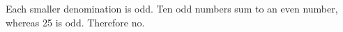 Each smaller denomination is odd. Ten odd numbers sum to an even number, whereas 25 is odd. Therefore $\boxed{\text{no}}$.
